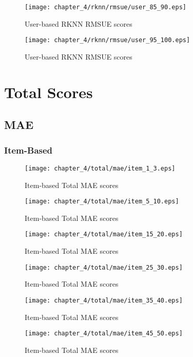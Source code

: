 \begin{figure}[H]
\centering
\texttt{[image: chapter\_4/rknn/rmsue/user\_85\_90.eps]}
\caption{User-based RKNN RMSUE scores}
\end{figure}

\begin{figure}[H]
\centering
\texttt{[image: chapter\_4/rknn/rmsue/user\_95\_100.eps]}
\caption{User-based RKNN RMSUE scores}
\end{figure}

\section{Total Scores}

\subsection{MAE}

\subsubsection{Item-Based}

\begin{figure}[H]
\centering
\texttt{[image: chapter\_4/total/mae/item\_1\_3.eps]}
\caption{Item-based Total MAE scores}
\end{figure}

\begin{figure}[H]
\centering
\texttt{[image: chapter\_4/total/mae/item\_5\_10.eps]}
\caption{Item-based Total MAE scores}
\end{figure}

\begin{figure}[H]
\centering
\texttt{[image: chapter\_4/total/mae/item\_15\_20.eps]}
\caption{Item-based Total MAE scores}
\end{figure}

\begin{figure}[H]
\centering
\texttt{[image: chapter\_4/total/mae/item\_25\_30.eps]}
\caption{Item-based Total MAE scores}
\end{figure}

\begin{figure}[H]
\centering
\texttt{[image: chapter\_4/total/mae/item\_35\_40.eps]}
\caption{Item-based Total MAE scores}
\end{figure}

\begin{figure}[H]
\centering
\texttt{[image: chapter\_4/total/mae/item\_45\_50.eps]}
\caption{Item-based Total MAE scores}
\end{figure}

